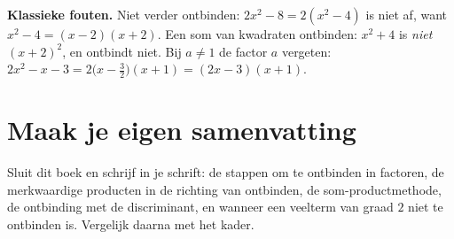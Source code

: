 \textbf{Klassieke fouten.} Niet verder ontbinden: $2x^2 - 8 = 2(x^2 - 4)$ is niet af, want $x^2 - 4 = (x - 2)(x + 2)$. Een som van kwadraten ontbinden: $x^2 + 4$ is \emph{niet} $(x + 2)^2$, en ontbindt niet. Bij $a \neq 1$ de factor $a$ vergeten: $2x^2 - x - 3 = 2\bigl(x - \tfrac32\bigr)(x + 1) = (2x - 3)(x + 1)$.


\opdrachtenkop

\begin{oefeningen}









\end{oefeningen}


\begin{oefeningen}



\end{oefeningen}


\ifzelfstudie
\section*{Maak je eigen samenvatting}
Sluit dit boek en schrijf in je schrift: de stappen om te ontbinden in factoren, de merkwaardige producten in de richting van ontbinden, de som-productmethode, de ontbinding met de discriminant, en wanneer een veelterm van graad $2$ niet te ontbinden is. Vergelijk daarna met het kader.
\fi
